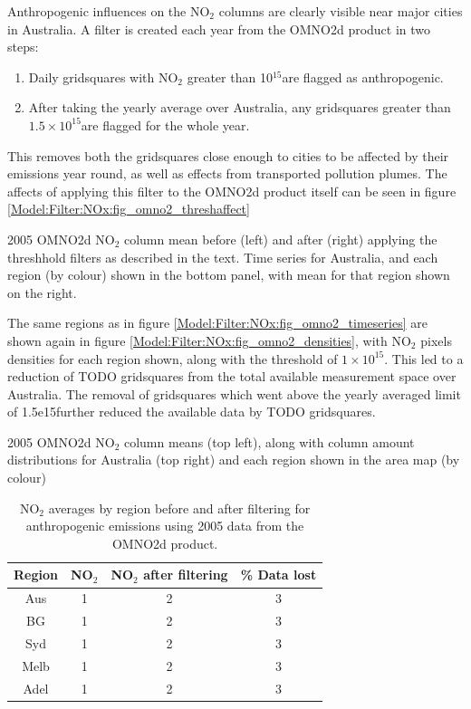     Anthropogenic influences on the NO$_2$ columns are clearly visible near major cities in Australia.
    A filter is created each year from the OMNO2d product in two steps:
    \begin{enumerate}
      \item Daily gridsquares with NO$_2$ greater than 10$^{15}$\moleccm  are flagged as anthropogenic.
      \item After taking the yearly average over Australia, any gridsquares greater than $1.5 \times 10^{15}$\moleccm are flagged for the whole year.
    \end{enumerate}
    This removes both the gridsquares close enough to cities to be affected by their emissions year round, as well as effects from transported pollution plumes.
    The affects of applying this filter to the OMNO2d product itself can be seen in figure \ref{Model:Filter:NOx:fig_omno2_threshaffect}
    
    {2005 OMNO2d NO$_2$ column mean before (left) and after (right) applying the threshhold filters as described in the text. Time series for Australia, and each region (by colour) shown in the bottom panel, with mean for that region shown on the right.}
    {\label{Model:Filter:NOx:fig_omno2_threshaffect}}
    
    The same regions as in figure \ref{Model:Filter:NOx:fig_omno2_timeseries} are shown again in figure \ref{Model:Filter:NOx:fig_omno2_densities}, with NO$_2$ pixels densities for each region shown, along with the threshold of $1 \times 10^{15}$\moleccm.
    This led to a reduction of TODO gridsquares from the total available measurement space over Australia.
    The removal of gridsquares which went above the yearly averaged limit of 1.5e15\moleccm further reduced the available data by TODO gridsquares.
    
    {2005 OMNO2d NO$_2$ column means (top left), along with column amount distributions for Australia (top right) and each region shown in the area map (by colour)}
    {\label{Model:Filter:NOx:fig_omno2_densities}}
    
    \begin{table}
      \caption{NO$_2$ averages by region before and after filtering for anthropogenic emissions using 2005 data from the OMNO2d product.}
      \begin{tabular}{ c c c c }
        \hline
        \textbf{Region} & \textbf{NO$_2$} & \textbf{NO$_2$ after filtering} & \textbf{\% Data lost} 
        \\ \hline
        Aus & 1 & 2 & 3 \\
        BG & 1 & 2 & 3 \\
        Syd & 1 & 2 & 3 \\
        Melb & 1 & 2 & 3 \\
        Adel & 1 & 2 & 3 \\
        \hline
      \end{tabular}
      \label{Model:Filter:NOx:tab_summary}
    \end{table}
    
